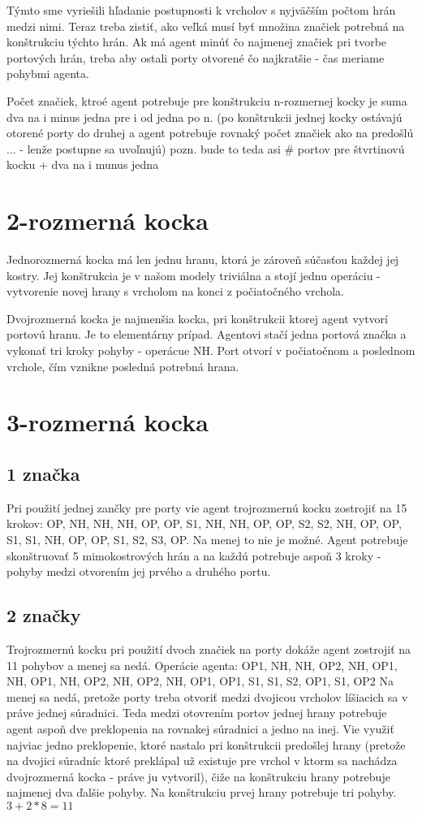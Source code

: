 Týmto sme vyriešili hľadanie postupnosti k vrcholov s nyjväčším počtom hrán
medzi nimi. Teraz treba zistiť, ako veľká musí byť množina značiek potrebná
na konštrukciu týchto hrán.
Ak má agent minúť čo najmenej značiek pri tvorbe portových hrán, treba aby
ostali porty otvorené čo najkratšie - čas meriame pohybmi agenta.

Počet značiek, ktroé agent potrebuje pre konštrukciu n-rozmernej kocky je
suma dva na i minus jedna pre i od jedna po n. (po konštrukcii jednej kocky
ostávajú otorené porty do druhej a agent potrebuje rovnaký počet značiek ako
na predošlú ... - lenže postupne sa uvoľnujú) pozn. bude to teda asi \#
portov pre štvrtinovú kocku + dva na i munus jedna
\fi 

\section{2-rozmerná kocka}
Jednorozmerná kocka má len jednu hranu, ktorá je zároveň súčasťou každej jej
kostry. Jej konštrukcia je v našom modely triviálna a stojí jednu operáciu -
vytvorenie novej hrany s vrcholom na konci z počiatočného vrchola.

Dvojrozmerná kocka je najmenšia kocka, pri konštrukcii ktorej agent vytvorí
portovú hranu. Je to elementárny prípad. Agentovi stačí jedna portová značka 
a vykonať tri kroky pohyby - operácue NH. Port otvorí v počiatočnom a
poslednom vrchole, čím vznikne posledná potrebná hrana.
\section{3-rozmerná kocka}
\subsection{1 značka}
Pri použití jednej zančky pre porty vie agent trojrozmernú kocku zostrojiť 
na 15 krokov:
OP, NH, NH, NH, OP, OP, S1, NH, NH, OP, OP, S2, S2, NH, OP, OP, S1, S1, NH, OP, OP, S1, S2, S3, OP. Na
menej to nie je možné. Agent potrebuje skonštruovať 5 mimokostrových hrán a na
každú potrebuje aspoň 3 kroky - pohyby medzi otvorením jej prvého a druhého portu.

\subsection{2 značky}
Trojrozmernú kocku pri použití dvoch značiek na porty dokáže agent zostrojiť
na 11 pohybov a menej sa nedá. Operácie agenta:
OP1, NH, NH, OP2, NH, OP1, NH, OP1, NH, OP2, NH, OP2, NH, OP1, OP1, S1, S1, S2, OP1, S1, OP2
Na menej sa nedá, pretože porty treba otvoriť medzi dvojicou vrcholov
líšiacich sa v práve jednej súradnici. Teda medzi otovrením portov jednej
hrany potrebuje agent aspoň dve preklopenia na rovnakej súradnici a jedno na
inej. Vie využiť najviac jedno preklopenie, ktoré nastalo pri konštrukcii
predošlej hrany (pretože na dvojici súradníc ktoré preklápal už existuje pre
vrchol v ktorm sa nachádza dvojrozmerná kocka - práve ju vytvoril), 
čiže na konštrukciu hrany potrebuje najmenej dva ďalšie
pohyby. Na konštrukciu prvej hrany potrebuje tri pohyby. $3 + 2 * 8 = 11$

